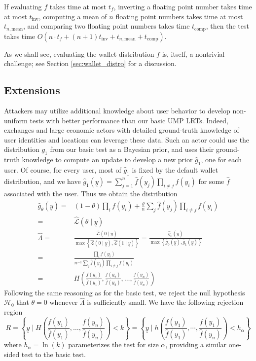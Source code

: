 \documentclass{tran-l}
\theoremstyle{cor}
\theoremstyle{definition}
\theoremstyle{remark}
\theoremstyle{conjecture}
\numberwithin{equation}{section}
\begin{document}
If evaluating $f$ takes time at most $t_f$, inverting a floating point number takes time at most $t_{\text{inv}}$, computing a mean of $n$ floating point numbers takes time at most $t_{n,\text{mean}}$, and comparing two floating point numbers takes time $t_{\text{comp}}$, then the test takes time $O(n \cdot t_f + (n+1)t_{\text{inv}} + t_{n, \text{mean}} + t_{\text{comp}})$.


As we shall see, evaluating the wallet distribution $f$ is, itself, a nontrivial challenge; see Section \ref{sec:wallet_distro} for a discussion.

\subsection{Extensions}\label{sec:basic_test_extended}


Attackers may utilize additional knowledge about user behavior to develop non-uniform tests with better performance than our basic UMP LRTs.
Indeed, exchanges and large economic actors with detailed ground-truth knowledge of user identities and locations can leverage these data.
Such an actor could use the distribution $g_1$ from our basic test as a Bayesian prior, and uses their ground-truth knowledge to compute an update to develop a new prior $\hat{g}_{1}$, one for each user.
Of course, for every user, most of $\hat{g}_1$ is fixed by the default wallet distribution, and we have
$\hat{g}_{1}(\underline{y}) = \sum_{j=1}^{n} \hat{f}(y_j) \prod_{i \neq j} f(y_i)$ for some $\hat{f}$ associated with the user. Thus we obtain the distribution
\begin{align}
\hat{g}_\theta(\underline{y}) =& (1-\theta) \prod_i f(y_i) + \frac{\theta}{n}\sum_j \hat{f}(y_j) \prod_{i \neq j} f(y_i) \\
=& \hat{\mathcal{L}}(\theta \mid \underline{y})\\
\hat{\Lambda} =& \frac{\hat{\mathcal{L}}(0 \mid \underline{y})}{\max\left\{\hat{\mathcal{L}}(0 \mid \underline{y}), \hat{\mathcal{L}}(1 \mid \underline{y})\right\}} = \frac{\hat{g}_0(\underline{y})}{\max\left\{\hat{g}_0(\underline{y}), \hat{g}_1(\underline{y})\right\}} \\
=& \frac{\prod_i f(y_i)}{n^{-1} \sum_j \hat{f}(y_j) \prod_{i \neq j} f(y_i)}\\
=& H\left(\frac{f(y_1)}{\hat{f}(y_1)}, \frac{f(y_2)}{\hat{f}(y_2)}, \ldots, \frac{f(y_n)}{\hat{f}(y_n)}\right)
\end{align}
Following the same reasoning as for the basic test, we reject the null hypothesis $\mathcal{H}_0$ that $\theta=0$ whenever $\hat{\Lambda}$ is sufficiently small.
We have the following rejection region \[R = \left\{\underline{y} \mid H\left(\frac{f(y_1)}{\hat{f}(y_1)}, \ldots, \frac{f(y_n)}{\hat{f}(y_n)}\right) < k \right\} = \left\{\underline{y} \mid h\left(\frac{f(y_1)}{\hat{f}(y_1)}, \cdots, \frac{f(y_1)}{\hat{f}(y_n)}\right) < h_{\alpha}\right\}\] where $h_{\alpha} = \ln(k)$ parameterizes the test for size $\alpha$, providing a similar one-sided test to the basic test.
\end{document}
